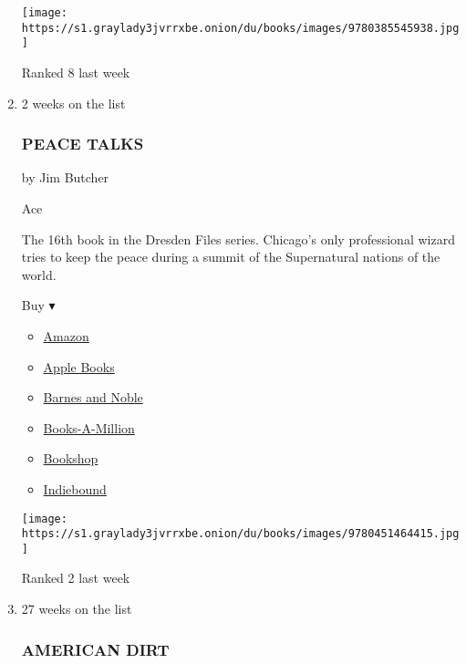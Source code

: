 \begin{enumerate}
  \texttt{[image: https://s1.graylady3jvrrxbe.onion/du/books/images/9780385545938.jpg]}

  Ranked 8 last week
\item
  2 weeks on the list

  \hypertarget{peace-talks}{%
  \subsubsection{PEACE TALKS}\label{peace-talks}}

  by Jim Butcher

  Ace

  The 16th book in the Dresden Files series. Chicago's only professional
  wizard tries to keep the peace during a summit of the Supernatural
  nations of the world.

  Buy ▾

  \begin{itemize}
  \tightlist
  \item
    \href{https://www.amazon.com/dp/0451464419?tag=NYTBSREV-20\&tag=NYTBS-20}{Amazon}
  \item
    \href{https://du-gae-books-dot-nyt-du-prd.appspot.com/buy?title=PEACE+TALKS\&author=Jim+Butcher}{Apple
    Books}
  \item
    \href{https://www.anrdoezrs.net/click-7990613-11819508?url=https\%3A\%2F\%2Fwww.barnesandnoble.com\%2Fw\%2F\%3Fean\%3D9780451464415}{Barnes
    and Noble}
  \item
    \href{https://www.anrdoezrs.net/click-7990613-35140?url=https\%3A\%2F\%2Fwww.booksamillion.com\%2Fp\%2FPEACE\%2BTALKS\%2FJim\%2BButcher\%2F9780451464415}{Books-A-Million}
  \item
    \href{https://bookshop.org/a/3546/9780451464415}{Bookshop}
  \item
    \href{https://www.indiebound.org/book/9780451464415?aff=NYT}{Indiebound}
  \end{itemize}

  \texttt{[image: https://s1.graylady3jvrrxbe.onion/du/books/images/9780451464415.jpg]}

  Ranked 2 last week
\item
  \href{https://www.nytimes3xbfgragh.onion/2020/01/17/books/review-american-dirt-jeanine-cummins.html}{}

  27 weeks on the list

  \hypertarget{american-dirt}{%
  \subsubsection{AMERICAN DIRT}\label{american-dirt}}


\end{enumerate}
